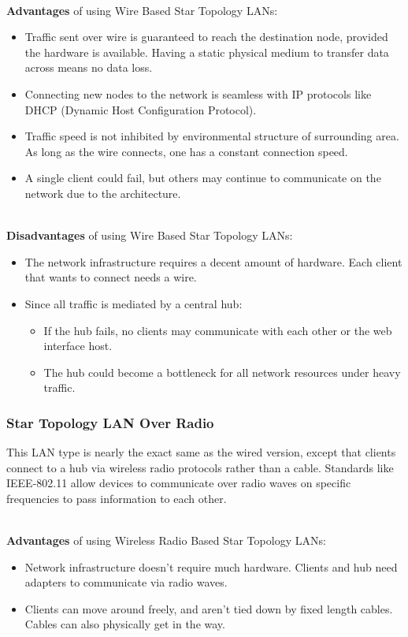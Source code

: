 \documentclass[onecolumn, draftclsnofoot,10pt, compsoc]{IEEEtran}
\begin{document}
		\noindent \\ \textbf{Advantages} of using Wire Based Star Topology LANs:
		\begin{itemize}
			\item Traffic sent over wire is guaranteed to reach the destination node, provided the hardware is available.  Having a static physical medium to transfer data across means no data loss.
			\item Connecting new nodes to the network is seamless with IP protocols like DHCP (Dynamic Host Configuration Protocol).
			\item Traffic speed is not inhibited by environmental structure of surrounding area.  As long as the wire connects, one has a constant connection speed.
			\item A single client could fail, but others may continue to communicate on the network due to the architecture.
		\end{itemize}

		\noindent \\ \textbf{Disadvantages} of using Wire Based Star Topology LANs:
		\begin{itemize}
			\item The network infrastructure requires a decent amount of hardware.  Each client that wants to connect needs a wire.
			\item Since all traffic is mediated by a central hub:
			\begin{itemize}
				\item If the hub fails, no clients may communicate with each other or the web interface host.
				\item The hub could become a bottleneck for all network resources under heavy traffic.
			\end{itemize}
		\end{itemize}

		\subsubsection{Star Topology LAN Over Radio}
		This LAN type is nearly the exact same as the wired version, except that clients connect to a hub via wireless radio protocols rather than a cable.
		Standards like IEEE-802.11 allow devices to communicate over radio waves on specific frequencies to pass information to each other.\cite{LAN3}

		\noindent \\ \textbf{Advantages} of using Wireless Radio Based Star Topology LANs:
		\begin{itemize}
			\item Network infrastructure doesn't require much hardware.  Clients and hub need adapters to communicate via radio waves.
			\item Clients can move around freely, and aren't tied down by fixed length cables.  Cables can also physically get in the way.
		\end{itemize}
\end{document}
